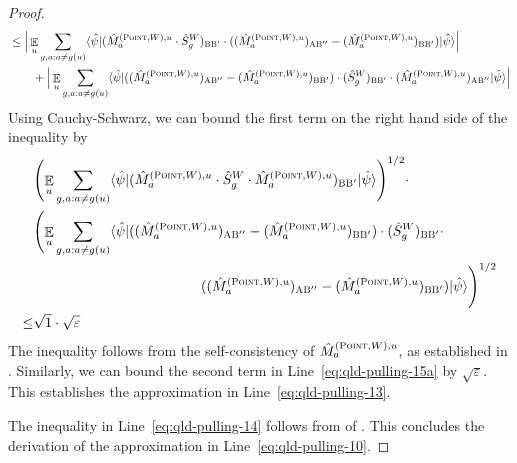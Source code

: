 \documentclass[11pt]{article}
\theoremstyle{definition}
\newcommand{\ket}[1]{|#1\rangle}
\newcommand{\bra}[1]{\langle#1|}
\newcommand{\eps}{\varepsilon}
\newcommand{\E}{\mathop{\mathbb{E}}\displaylimits}
\newcommand{\labelstyle}[1]{\ensuremath{\textsc{#1}}\xspace}
\newcommand{\alice}{\labelstyle{A}}
\newcommand{\bob}{\labelstyle{B}}
\newcommand{\typestyle}[1]{\ensuremath{\textsc{#1}}\xspace}
\newcommand{\Point}{\typestyle{Point}}
\begin{document}
\begin{proof}
\begin{align}
	&\leq \Big | \E_u \sum_{g,a: a \neq g(u)} \bra{\hat{\psi}} (\hat{M}^{(\Point,W),u}_{a} \cdot \hat{S}^W_{g})_{\bob \bob'} \cdot ((\hat{M}^{(\Point,W),u}_{a})_{\alice \bob''} - (\hat{M}^{(\Point,W),u}_{a})_{\bob \bob'}) \ket{\hat{\psi}} \Big | \label{eq:qld-pulling-15} \\
	& \qquad + \Big | \E_u \sum_{g,a: a \neq g(u)} \bra{\hat{\psi}} ((\hat{M}^{(\Point,W),u}_{a})_{\alice \bob''} - (\hat{M}^{(\Point,W),u}_{a})_{\bob \bob'}) \cdot (\hat{S}^W_{g})_{\bob \bob'} \cdot (\hat{M}^{(\Point,W),u}_{a})_{\alice \bob''} \ket{\hat{\psi}} \Big | \label{eq:qld-pulling-15a}
\end{align}
Using Cauchy-Schwarz, we can bound the first term on the right hand side of the inequality by
\begin{align}
	&\Biggl( \E_u \sum_{g,a: a \neq g(u)} \bra{\hat{\psi}} (\hat{M}^{(\Point,W),u}_{a} \cdot \hat{S}^W_{g} \cdot \hat{M}^{(\Point,W),u}_{a})_{\bob \bob'} \ket{\hat{\psi}}  \Biggr)^{1/2} \cdot \notag \\
	&\Biggl( \E_u \sum_{g,a: a \neq g(u)} \bra{\hat{\psi}} ((\hat{M}^{(\Point,W),u}_{a})_{\alice \bob''} - (\hat{M}^{(\Point,W),u}_{a})_{\bob \bob'}) \cdot (\hat{S}^W_{g})_{\bob \bob'} \cdot \notag\\
  & \hspace{12em}((\hat{M}^{(\Point,W),u}_{a})_{\alice \bob''} - (\hat{M}^{(\Point,W),u}_{a})_{\bob \bob'})  \ket{\hat{\psi}}  \Biggr)^{1/2} \notag \\
	\leq & \sqrt{1} \cdot \sqrt{\eps} \notag
\end{align}
The inequality follows from the self-consistency of $\hat{M}^{(\Point,W),u}_{a}$, as established in . Similarly, we can bound the second term in Line~\eqref{eq:qld-pulling-15a} by $\sqrt{\eps}$.
This establishes the approximation in Line~\eqref{eq:qld-pulling-13}. 

The inequality in Line~\eqref{eq:qld-pulling-14} follows from  of . This concludes the derivation of the approximation in Line~\eqref{eq:qld-pulling-10}.


\end{proof}
\end{document}
